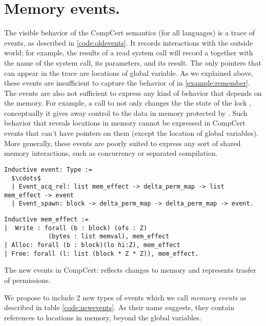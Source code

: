 \section{Memory events.}

The visible behavior of the CompCert semantics (for all languages) is a trace of events, as described in \ref{code:oldevents}. It records interactions with the outside world; for example, the results of a read system call will record a  together with the name of the system call, its parameters, and its result. The only pointers that can appear in the trace are locations of global variable. As we explained above, these events are insufficient to capture the behavior of  in \ref{example:remember}. The events are also not sufficient to express any kind of behavior that depends on the memory. For example, a call to  not only changes the the state of the lock , conceptually it gives away control to the data in memory protected by . Such behavior that reveals locations in memory cannot be expressed in CompCert events that can't have pointers on them (except the location of global variables). More generally, these events are poorly suited to express any sort of shared memory interactions, such as concurrency or separated compilation. 
\begin{table}\centering
\begin{multicols}{2}
\begin{lstlisting}[style=CoqTheorem-list]
Inductive event: Type :=
  $\cdots$
  | Event_acq_rel: list mem_effect -> delta_perm_map -> list mem_effect -> event
  | Event_spawn: block -> delta_perm_map -> delta_perm_map -> event.
  \end{lstlisting}
  
  \begin{lstlisting}
Inductive mem_effect :=
|  Write : forall (b : block) (ofs : Z)
            (bytes : list memval), mem_effect
| Alloc: forall (b : block)(lo hi:Z), mem_effect
| Free: forall (l: list (block * Z * Z)), mem_effect.
  \end{lstlisting}
\end{multicols}
\caption{The new events in CompCert:   reflects changes to memory and  represents trasfer of  permissions.}\label{code:newevents}
\end{table}
We propose to include 2 new types of events which we call \emph{memory events} as described in table \ref{code:newevents}. As their name suggests, they contain references to locations in memory, beyond the global variables.  
